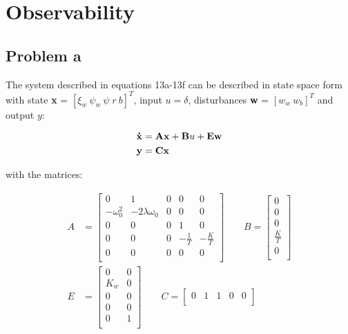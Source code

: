 \section{Observability}
\subsection{Problem a}
The system described in equations 13a-13f \cite{assignment} can be described in state space form 
with state \textbf{x} = $[\xi_w\: \psi_w\: \psi\; r\: b]^T$, input $u = \delta$, 
disturbances \textbf{w} = $[w_w\: w_b]^T$ and output $y$:

\begin{align*}
    \bf{\dot{x}} &= \textbf{Ax} + \textbf{B}u + \textbf{Ew} \\
    \textbf{y} &= \textbf{Cx}
\end{align*}

with the matrices:

\begin{equation}
    \label{eq:State Space With Disturbances}
    \begin{aligned}
        A &= 
    	\begin{bmatrix}
        0           &      1            & 0 & 0 			 & 0 \\
        -\omega_0^2 & -2\lambda\omega_0 & 0 & 0 			 & 0 \\
        0           & 0                 & 0 & 1              & 0 \\
    	0           & 0                 & 0 & -\frac{1}{T}   & -\frac{K}{T} \\
    	0           & 0                 & 0 & 0 			 & 0 \\
      \end{bmatrix}
      \qquad
      B =
      \begin{bmatrix}
        0 \\
        0 \\
    	0 \\
        \frac{K}{T} \\
        0 \\
      \end{bmatrix}
      \\
      E &=
      \begin{bmatrix}
        0   & 0 \\
        K_w & 0 \\
    	0   & 0 \\
        0   & 0 \\
        0   & 1 \\
      \end{bmatrix}
      \qquad
      C =
      \begin{bmatrix}
        0 & 1 & 1 & 0 & 0 \\
      \end{bmatrix}
    \end{aligned}
\end{equation}

